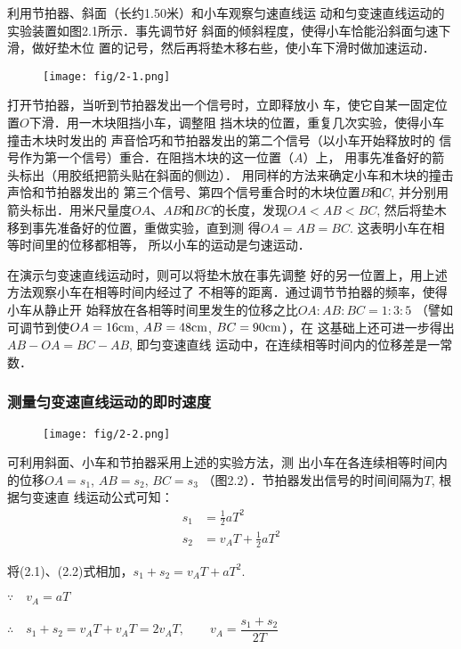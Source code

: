 利用节拍器、斜面（长约1.50米）和小车观察匀速直线运
动和匀变速直线运动的实验装置如图2.1所示．事先调节好
斜面的倾斜程度，使得小车恰能沿斜面匀速下滑，做好垫木位
置的记号，然后再将垫木移右些，使小车下滑时做加速运动．
\begin{figure}[htp]
    \centering
    \texttt{[image: fig/2-1.png]}
    \caption{}
\end{figure}

打开节拍器，当听到节拍器发出一个信号时，立即释放小
车，使它自某一固定位置$O$下滑．用一木块阻挡小车，调整阻
挡木块的位置，重复几次实验，使得小车撞击木块时发出的
声音恰巧和节拍器发出的第二个信号（以小车开始释放时的
信号作为第一个信号）重合．在阻挡木块的这一位置（$A$）上，
用事先准备好的箭头标出（用胶纸把箭头贴在斜面的侧边）．
用同样的方法来确定小车和木块的撞击声恰和节拍器发出的
第三个信号、第四个信号重合时的木块位置$B$和$C$, 并分别用
箭头标出．用米尺量度$OA$、$AB$和$BC$的长度，发现$OA<AB
<BC$, 然后将垫木移到事先准备好的位置，重做实验，直到测
得$OA=AB=BC$. 这表明小车在相等时间里的位移都相等，
所以小车的运动是匀速运动．

在演示匀变速直线运动时，则可以将垫木放在事先调整
好的另一位置上，用上述方法观察小车在相等时间内经过了
不相等的距离．通过调节节拍器的频率，使得小车从静止开
始释放在各相等时间里发生的位移之比$OA:AB:BC=1:3:5$
（譬如可调节到使$OA=16{\rm cm}$, $AB=48{\rm cm}$, $BC=90{\rm cm}$），在
这基础上还可进一步得出$AB-OA=BC-AB$, 即匀变速直线
运动中，在连续相等时间内的位移差是一常数．

\subsubsection{测量匀变速直线运动的即时速度}

\begin{figure}[htp]
    \centering
    \texttt{[image: fig/2-2.png]}
    \caption{}
\end{figure}


可利用斜面、小车和节拍器采用上述的实验方法，测
出小车在各连续相等时间内的位移$OA=s_1$, $AB=s_2$, $BC=s_3$
（图2.2）．节拍器发出信号的时间间隔为$T$, 根据匀变速直
线运动公式可知：
\begin{align}
    s_1&=\frac{1}{2}aT^2\\
    s_2&=v_AT+\frac{1}{2}aT^2
\end{align}

将(2.1)、(2.2)式相加，$s_1+s_2=v_A T+aT^2$.

$\because\quad v_A=aT$

$\therefore\quad s_1+s_2=v_AT+v_AT=2v_AT,\qquad v_A=\dfrac{s_1+s_2}{2T}$

